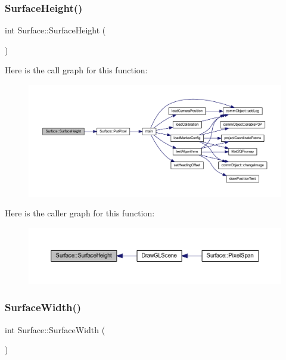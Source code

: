 \subsubsection{\texorpdfstring{Surface\+Height()}{SurfaceHeight()}}
{\footnotesize\ttfamily int Surface\+::\+Surface\+Height (\begin{DoxyParamCaption}{ }\end{DoxyParamCaption})\hspace{0.3cm}{\ttfamily [inline]}}

Here is the call graph for this function\+:
\nopagebreak
\begin{figure}[H]
\begin{center}
\leavevmode
\includegraphics[width=350pt]{class_surface_a377c59f6ef131d4b879cda93578a3efa_cgraph}
\end{center}
\end{figure}
Here is the caller graph for this function\+:
\nopagebreak
\begin{figure}[H]
\begin{center}
\leavevmode
\includegraphics[width=350pt]{class_surface_a377c59f6ef131d4b879cda93578a3efa_icgraph}
\end{center}
\end{figure}
\mbox{\label{class_surface_a4cbf23ea0c8ff533271109fc2a1a863d}} 
\subsubsection{\texorpdfstring{Surface\+Width()}{SurfaceWidth()}}
{\footnotesize\ttfamily int Surface\+::\+Surface\+Width (\begin{DoxyParamCaption}{ }\end{DoxyParamCaption})\hspace{0.3cm}{\ttfamily [inline]}}

